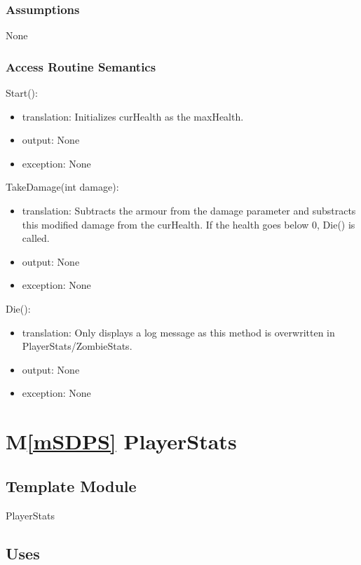 \documentclass[12pt]{article}
\newcommand{\mref}[1]{M\ref{#1}}
\begin{document}
\subsubsection* {Assumptions}

None

\subsubsection* {Access Routine Semantics}

\noindent Start():
\begin{itemize}
\item translation: Initializes curHealth as the maxHealth.
\item output: None
\item exception: None
\end{itemize}

\noindent TakeDamage(int damage):
\begin{itemize}
\item translation: Subtracts the armour from the damage parameter and substracts this modified damage from the curHealth. If the health goes below 0, Die() is called.
\item output: None
\item exception: None
\end{itemize}

\noindent Die():
\begin{itemize}
\item translation: Only displays a log message as this method is overwritten in PlayerStats/ZombieStats.
\item output: None
\item exception: None
\end{itemize}

\newpage

\section* {\mref{mSDPS} PlayerStats}

\subsection*{Template Module}

PlayerStats

\subsection* {Uses}
\end{document}
